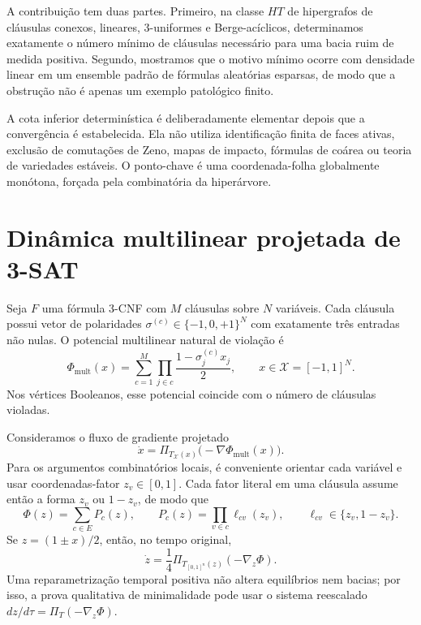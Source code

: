 \documentclass[11pt,a4paper]{article}
\begin{document}
A contribuição tem duas partes. Primeiro, na classe $HT$ de hipergrafos de cláusulas conexos, lineares, 3-uniformes e Berge-acíclicos, determinamos exatamente o número mínimo de cláusulas necessário para uma bacia ruim de medida positiva. Segundo, mostramos que o motivo mínimo ocorre com densidade linear em um ensemble padrão de fórmulas aleatórias esparsas, de modo que a obstrução não é apenas um exemplo patológico finito.

A cota inferior determinística é deliberadamente elementar depois que a convergência é estabelecida. Ela não utiliza identificação finita de faces ativas, exclusão de comutações de Zeno, mapas de impacto, fórmulas de coárea ou teoria de variedades estáveis. O ponto-chave é uma coordenada-folha globalmente monótona, forçada pela combinatória da hiperárvore.

\section{Dinâmica multilinear projetada de 3-SAT}
Seja $F$ uma fórmula 3-CNF com $M$ cláusulas sobre $N$ variáveis. Cada cláusula possui vetor de polaridades $\sigma^{(c)}\in\{-1,0,+1\}^N$ com exatamente três entradas não nulas. O potencial multilinear natural de violação é
\begin{equation}
\Phi_{\mathrm{mult}}(x)=\sum_{c=1}^M\prod_{j\in c}\frac{1-\sigma_j^{(c)}x_j}{2},
\qquad x\in\mathcal X=[-1,1]^N.
\end{equation}
Nos vértices Booleanos, esse potencial coincide com o número de cláusulas violadas.

Consideramos o fluxo de gradiente projetado
\begin{equation}
\dot x=\Pi_{T_{\mathcal X}(x)}\bigl(-\nabla\Phi_{\mathrm{mult}}(x)\bigr).
\end{equation}
Para os argumentos combinatórios locais, é conveniente orientar cada variável e usar coordenadas-fator $z_v\in[0,1]$. Cada fator literal em uma cláusula assume então a forma $z_v$ ou $1-z_v$, de modo que
\[
\Phi(z)=\sum_{c\in E}P_c(z),\qquad
P_c(z)=\prod_{v\in c}\ell_{cv}(z_v),\qquad
\ell_{cv}\in\{z_v,1-z_v\}.
\]
Se $z=(1\pm x)/2$, então, no tempo original,
\begin{equation}
\dot z=\frac14\Pi_{T_{[0,1]^n}(z)}(-\nabla_z\Phi).
\end{equation}
Uma reparametrização temporal positiva não altera equilíbrios nem bacias; por isso, a prova qualitativa de minimalidade pode usar o sistema reescalado $dz/d\tau=\Pi_T(-\nabla_z\Phi)$.
\end{document}
